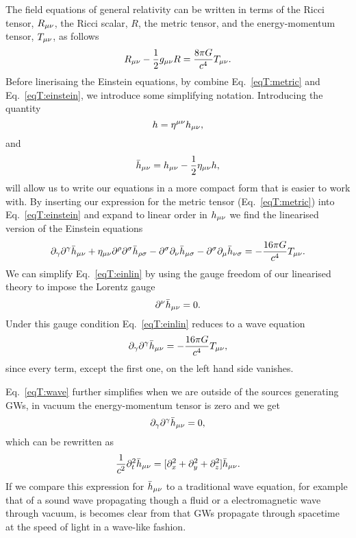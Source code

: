 The field equations of general relativity can
be written in terms of the Ricci tensor, $R_{\mu\nu}$, the Ricci scalar, $R$, the metric tensor,
and the energy-momentum tensor, $T_{\mu\nu}$, as follows
\begin{equation} \label{eqT:einstein}
R_{\mu\nu} - \frac{1}{2} g_{\mu\nu} R = \frac{8 \pi G}{c^4 } T_{\mu\nu}. 
\end{equation}
Before linerisaing the Einstein equations, by combine Eq.~\ref{eqT:metric} and Eq.~\ref{eqT:einstein}, we introduce some simplifying notation.
Introducing the quantity
\begin{equation} \label{eqT:h}
h = \eta^{\mu\nu}h_{\mu\nu},
\end{equation}
and
\begin{equation} \label{eqT:hbar}
\bar{h}_{\mu\nu} = h_{\mu\nu} - \frac{1}{2}\eta_{\mu\nu}h,
\end{equation}
will allow us to write our equations in a more compact form that is easier to work with.
By inserting our expression for the metric tensor (Eq.~\ref{eqT:metric}) into Eq.~\ref{eqT:einstein}
and expand to linear order in $h_{\mu\nu}$ we find the linearised version of the Einstein equations
\begin{equation} \label{eqT:einlin}
\partial_{\gamma} \partial^{\gamma} \bar{h}_{\mu\nu} + \eta_{\mu\nu} \partial^{\rho} \partial^{\sigma} \bar{h}_{\rho \sigma}
- \partial^{\sigma}\partial_{\nu}\bar{h}_{\mu \sigma} -  \partial^{\sigma}\partial_{\mu}\bar{h}_{\nu \sigma}
= -\frac{16 \pi G}{c^4 } T_{\mu\nu}.
\end{equation}
We can simplify Eq.~\ref{eqT:einlin} by using the gauge freedom of our linearised theory to impose the Lorentz gauge
\begin{equation} \label{eqT:lor}
\partial^{\nu} \bar{h}_{\mu\nu} = 0.
\end{equation}
Under this gauge condition Eq.~\ref{eqT:einlin} reduces to a wave equation 
\begin{equation} \label{eqT:wave}
\partial_{\gamma} \partial^{\gamma} \bar{h}_{\mu\nu} = -\frac{16 \pi G}{c^4 } T_{\mu\nu},
\end{equation}
since every term, except the first one, on the left hand side vanishes. 

Eq.~\ref{eqT:wave} further simplifies when we are outside of the sources generating
GWs, in vacuum the energy-momentum tensor is zero and we get  
\begin{equation} \label{eqT:wavevacumm}
\partial_{\gamma} \partial^{\gamma} \bar{h}_{\mu\nu} = 0,
\end{equation}
which can be rewritten as
\begin{equation} \label{eqT:wavevacumm2}
\frac{1}{c^2} \partial_t^2 \bar{h}_{\mu\nu} = [ \partial^2_x  + \partial_y^2 + \partial_z^2] \bar{h}_{\mu\nu}.
\end{equation}
If we compare this expression for $\bar{h}_{\mu\nu}$ to a traditional wave equation, for example that of a sound wave
propagating though a fluid or a electromagnetic wave through vacuum, is becomes clear from that GWs propagate through 
spacetime at the speed of light in a wave-like fashion.

